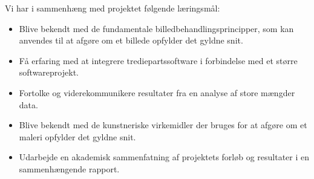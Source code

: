 Vi har i sammenhæng med projektet følgende læringsmål:

\begin{itemize}
	\item Blive bekendt med de fundamentale
		billedbehandlingsprincipper, som kan anvendes til at
		afgøre om et billede opfylder det gyldne snit.
	\item Få erfaring med at integrere trediepartssoftware i
		forbindelse med et større softwareprojekt.
	\item Fortolke og viderekommunikere resultater fra en analyse af
		store mængder data.
	\item Blive bekendt med de kunstneriske virkemidler der bruges
		for at afgøre om et maleri opfylder det gyldne snit. 
	\item Udarbejde en akademisk sammenfatning af projektets forløb
		og resultater i en sammenhængende rapport. 
\end{itemize}
